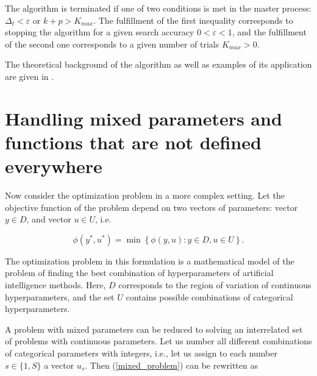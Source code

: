\documentclass[runningheads]{llncs}
\begin{document}
The algorithm is terminated if one of two conditions is met in the master process: $\Delta_t< \varepsilon$ or $k+p>K_{max}$. The fulfillment of the first inequality corresponds to stopping the algorithm for a given search accuracy $0< \varepsilon <1$, and the fulfillment of the second one corresponds to a given number of trials $K_{max}>0$.

The theoretical background of the algorithm as well as examples of its application are given in  \cite{Barkalov2018,Barkalov2023,Gubaydullin2021,Strongin2020}.

\section{Handling mixed parameters and functions that are not defined everywhere}\label{sec:MP}

Now consider the optimization problem in a more complex setting. Let the objective function of the problem depend on two vectors of parameters: vector $y \in D$, and vector $u \in U$, i.e.

\begin{equation}\label{mixed_problem} 
\phi(y^*, u^*) = \min \left\{\phi(y, u): y \in D, u \in U\right\}.
\end{equation}

The optimization problem in this formulation is a mathematical model of the problem of finding the best combination of hyperparameters of artificial intelligence methods. Here, $D$ corresponds to the region of variation of continuous hyperparameters, and the set $U$ contains possible combinations of categorical hyperparameters.

A problem with mixed parameters can be reduced to solving an interrelated set of problems with continuous parameters. Let us number all different combinations of categorical parameters with integers, i.e., let us assign to each number $s \in \{1, S\}$ a vector $u_s$. Then (\ref{mixed_problem}) can be rewritten as 
\end{document}
